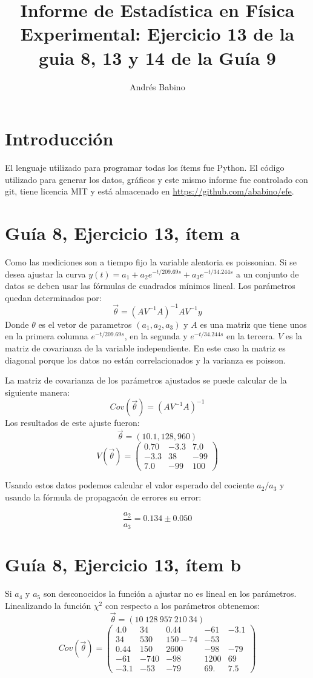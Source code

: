 \title{Informe de Estadística en Física Experimental: Ejercicio 13 de la guia 8,  13 y 14 de la  Guía 9}
\author{Andrés Babino}


\maketitle
\section{Introducción}
El lenguaje utilizado para programar todas los ítems fue Python.
El código utilizado para generar los datos, gráficos y este mismo informe fue controlado con git, tiene licencia MIT y está almacenado en \url{https://github.com/ababino/efe}.

\section*{Guía 8, Ejercicio 13, ítem a}
Como las mediciones son a tiempo fijo la variable aleatoria es poissonian.
Si se desea ajustar la curva $y(t) = a_1 + a_2 e^{-t/209.69s} + a_3 e^{-t/34.244s}$ a un conjunto de datos se deben usar las fórmulas de cuadrados mínimos lineal.
Los parámetros quedan determinados por:
$$
\vec{\theta} = (AV^{-1}A)^{-1}AV^{-1}y
$$
Donde $\theta$ es el vetor de parametros $(a_1, a_2, a_3)$ y $A$ es una matriz que tiene unos en la primera columna $e^{-t/209.69s}$, en la segunda y $e^{-t/34.244s}$ en la tercera.
$V$ es la matriz de covarianza de la variable independiente.
En este caso la matriz es diagonal porque los datos no están correlacionados y la varianza es poisson.

La matriz de covarianza de los parámetros ajustados se puede calcular de la siguiente manera:
$$
Cov(\vec{\theta}) = (AV^{-1}A)^{-1}
$$
Los resultados de este ajuste fueron:
$$
\vec{\theta} = (10.1, 128, 960)
$$
$$
V(\vec{\theta}) =\left(
\begin{matrix}
0.70 &-3.3 & 7.0 \\
-3.3 & 38 &-99 \\
7.0  & -99 & 100
\end{matrix} \right)
$$

Usando estos datos podemos calcular el valor esperado del cociente $a_2/a_3$ y usando la fórmula de propagacón de errores su error:

$$
\frac{a_2}{a_3} = 0.134 \pm 0.050
$$

\section*{Guía 8, Ejercicio 13, ítem b}
Si $a_4$ y $a_5$ son desconocidos la función a ajustar no es lineal en los parámetros.
Linealizando la función $\chi^2$ con respecto a los parámetros obtenemos:
$$
\vec{\theta}=(10\ 128\ 957\  210\  34)
$$
$$
Cov(\vec{\theta}) = \left(
\begin{matrix}
4.0 & 34 &  0.44 & -61 & -3.1\\
34 & 530 & 150  -74 & -53\\
0.44 & 150 & 2600 & -98 & -79\\
-61 & -740 & -98 & 1200 & 69\\
-3.1 & -53 & -79 & 69. & 7.5
\end{matrix}
\right)
$$
